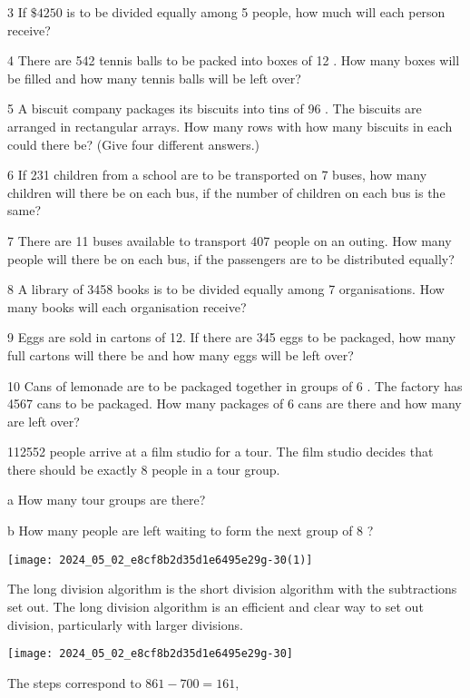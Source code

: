 \documentclass[10pt]{article}
\begin{document}
3 If \(\$ 4250\) is to be divided equally among 5 people, how much will each person receive?

4 There are 542 tennis balls to be packed into boxes of 12 . How many boxes will be filled and how many tennis balls will be left over?

5 A biscuit company packages its biscuits into tins of 96 . The biscuits are arranged in rectangular arrays. How many rows with how many biscuits in each could there be? (Give four different answers.)

6 If 231 children from a school are to be transported on 7 buses, how many children will there be on each bus, if the number of children on each bus is the same?

7 There are 11 buses available to transport 407 people on an outing. How many people will there be on each bus, if the passengers are to be distributed equally?

8 A library of 3458 books is to be divided equally among 7 organisations. How many books will each organisation receive?

9 Eggs are sold in cartons of 12. If there are 345 eggs to be packaged, how many full cartons will there be and how many eggs will be left over?

10 Cans of lemonade are to be packaged together in groups of 6 . The factory has 4567 cans to be packaged. How many packages of 6 cans are there and how many are left over?

112552 people arrive at a film studio for a tour. The film studio decides that there should be exactly 8 people in a tour group.

a How many tour groups are there?

b How many people are left waiting to form the next group of 8 ?

\begin{center}
\texttt{[image: 2024\_05\_02\_e8cf8b2d35d1e6495e29g-30(1)]}
\end{center}

The long division algorithm is the short division algorithm with the subtractions set out. The long division algorithm is an efficient and clear way to set out division, particularly with larger divisions.

\begin{center}
\texttt{[image: 2024\_05\_02\_e8cf8b2d35d1e6495e29g-30]}
\end{center}

The steps correspond to \(861-700=161\),
\end{document}
